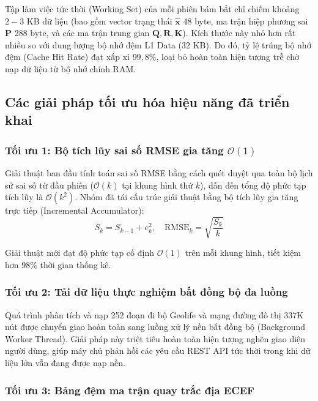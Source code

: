 Tập làm việc tức thời (Working Set) của mỗi phiên bám bắt chỉ chiếm khoảng $2 - 3$ KB dữ liệu (bao gồm vector trạng thái $\hat{\mathbf{x}}$ 48 byte, ma trận hiệp phương sai $\mathbf{P}$ 288 byte, và các ma trận trung gian $\mathbf{Q}, \mathbf{R}, \mathbf{K}$). Kích thước này nhỏ hơn rất nhiều so với dung lượng bộ nhớ đệm L1 Data (32 KB). Do đó, tỷ lệ trúng bộ nhớ đệm (Cache Hit Rate) đạt xấp xỉ $99{,}8\%$, loại bỏ hoàn toàn hiện tượng trễ chờ nạp dữ liệu từ bộ nhớ chính RAM.

\subsection{Các giải pháp tối ưu hóa hiệu năng đã triển khai}

\subsubsection{Tối ưu 1: Bộ tích lũy sai số RMSE gia tăng \texorpdfstring{$\mathcal{O}(1)$}{O(1)}}

\hspace{0.5cm} Giải thuật ban đầu tính toán sai số RMSE bằng cách quét duyệt qua toàn bộ lịch sử sai số từ đầu phiên ($\mathcal{O}(k)$ tại khung hình thứ $k$), dẫn đến tổng độ phức tạp tích lũy là $\mathcal{O}(k^2)$. Nhóm đã tái cấu trúc giải thuật bằng bộ tích lũy gia tăng trực tiếp (Incremental Accumulator):
\begin{equation}
S_k = S_{k-1} + e_k^2, \quad \text{RMSE}_k = \sqrt{\frac{S_k}{k}}
\label{eq:incremental-rmse-formula}
\end{equation}

Giải thuật mới đạt độ phức tạp cố định $\mathcal{O}(1)$ trên mỗi khung hình, tiết kiệm hơn $98\%$ thời gian thống kê.

\subsubsection{Tối ưu 2: Tải dữ liệu thực nghiệm bất đồng bộ đa luồng}

\hspace{0.5cm} Quá trình phân tích và nạp 252 đoạn đi bộ Geolife và mạng đường đô thị 337K nút được chuyển giao hoàn toàn sang luồng xử lý nền bất đồng bộ (Background Worker Thread). Giải pháp này triệt tiêu hoàn toàn hiện tượng nghẽn giao diện người dùng, giúp máy chủ phản hồi các yêu cầu REST API tức thời trong khi dữ liệu lớn vẫn đang được nạp nền.

\subsubsection{Tối ưu 3: Bảng đệm ma trận quay trắc địa ECEF}

